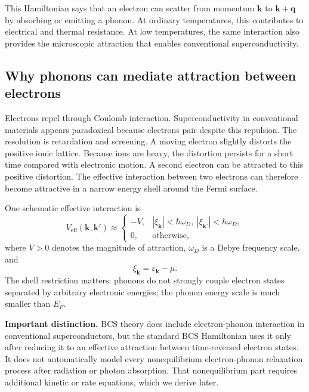 \documentclass[11pt]{article}
\newcommand{\bk}{{\bm{k}}}
\newcommand{\bq}{{\bm{q}}}
\newcommand{\eps}{\varepsilon}
\begin{document}
This Hamiltonian says that an electron can scatter from momentum $\bk$ to $\bk+\bq$ by absorbing or emitting a phonon. At ordinary temperatures, this contributes to electrical and thermal resistance. At low temperatures, the same interaction also provides the microscopic attraction that enables conventional superconductivity.

\subsection{Why phonons can mediate attraction between electrons}
Electrons repel through Coulomb interaction. Superconductivity in conventional materials appears paradoxical because electrons pair despite this repulsion. The resolution is retardation and screening. A moving electron slightly distorts the positive ionic lattice. Because ions are heavy, the distortion persists for a short time compared with electronic motion. A second electron can be attracted to this positive distortion. The effective interaction between two electrons can therefore become attractive in a narrow energy shell around the Fermi surface.

One schematic effective interaction is
\begin{equation}
 V_{\mathrm{eff}}(\bk,\bk')\approx
 \begin{cases}
 -V, & |\xi_\bk|<\hbar\omega_D,\ |\xi_{\bk'}|<\hbar\omega_D,\\
 0, & \text{otherwise},
 \end{cases}
\end{equation}
where $V>0$ denotes the magnitude of attraction, $\omega_D$ is a Debye frequency scale, and
\begin{equation}
\xi_\bk=\eps_\bk-\mu.
\end{equation}
The shell restriction matters: phonons do not strongly couple electron states separated by arbitrary electronic energies; the phonon energy scale is much smaller than $E_F$.

\begin{notebox}
\textbf{Important distinction.} BCS theory does include electron-phonon interaction in conventional superconductors, but the standard BCS Hamiltonian uses it only after reducing it to an effective attraction between time-reversed electron states. It does not automatically model every nonequilibrium electron-phonon relaxation process after radiation or photon absorption. That nonequilibrium part requires additional kinetic or rate equations, which we derive later.
\end{notebox}
\end{document}
